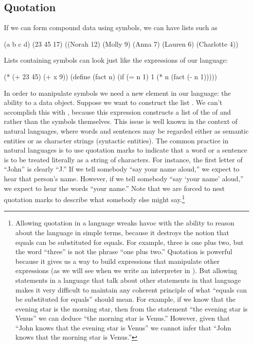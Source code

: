 \subsection{Quotation}
\label{Section 2.3.1}

If we can form compound data using symbols, we can have lists such as

\begin{codeBlock}
(a b c d)
(23 45 17)
((Norah 12) (Molly 9) (Anna 7) (Lauren 6) (Charlotte 4))
\end{codeBlock}

\noindent
Lists containing symbols can look just like the expressions of our
language:

\begin{codeBlock}
(* (+ 23 45)
   (+ x 9))
(define (fact n)
  (if (= n 1) 1 (* n (fact (- n 1)))))
\end{codeBlock}

\noindent
In order to manipulate symbols we need a new element in our language: the
ability to  a data object.  Suppose we want to construct the
list .  We can't accomplish this with , because
this expression constructs a list of the  of  and
 rather than the symbols themselves.  This issue is well known in the
context of natural languages, where words and sentences may be regarded either
as semantic entities or as character strings (syntactic entities).  The common
practice in natural languages is to use quotation marks to indicate that a word
or a sentence is to be treated literally as a string of characters.  For
instance, the first letter of ``John'' is clearly ``J.''  If we tell somebody
``say your name aloud,'' we expect to hear that person's name.  However, if we
tell somebody ``say `your name' aloud,'' we expect to hear the words ``your
name.''  Note that we are forced to nest quotation marks to describe what
somebody else might say.\footnote{Allowing quotation in a language wreaks havoc
with the ability to reason about the language in simple terms, because it
destroys the notion that equals can be substituted for equals.  For example,
three is one plus two, but the word ``three'' is not the phrase ``one plus
two.''  Quotation is powerful because it gives us a way to build expressions
that manipulate other expressions (as we will see when we write an interpreter
in ). But allowing statements in a language that talk about
other statements in that language makes it very difficult to maintain any
coherent principle of what ``equals can be substituted for equals'' should
mean.  For example, if we know that the evening star is the morning star, then
from the statement ``the evening star is Venus'' we can deduce ``the morning
star is Venus.''  However, given that ``John knows that the evening star is
Venus'' we cannot infer that ``John knows that the morning star is Venus.''}

